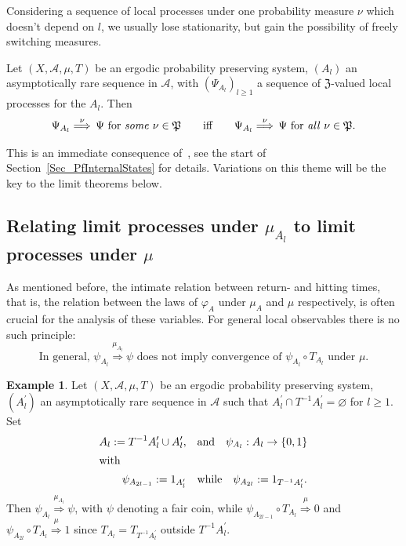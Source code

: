 \documentclass[10pt]{amsart}
\theoremstyle{definition}\newtheorem{defi}[theo]{Definition}\newtheorem{rema}[theo]{Remark}\newtheorem{exam}[theo]{Example}\newtheorem{exem}[theo]{Example}\newtheorem{nota}[theo]{Notation}
\newcommand{\clA}{\mathcal{A}}
\newcommand{\frkP}{\mathfrak{P}}
\newcommand{\frkZ}{\mathfrak{Z}}
\begin{document}
Considering a sequence of local processes under one probability measure $\nu$ which doesn't depend on $l$, we usually lose stationarity, but gain the possibility of freely switching measures.

\begin{prop}\label{P_SDCInternal}
Let $(X,\clA,\mu,T)$ be an ergodic probability preserving system, $(A_{l})$ an asymptotically rare sequence in $\clA$, with $(\Psi_{A_{l}})_{l\geq1}$ a sequence of $\frkZ$-valued local processes for the $A_{l}$. Then
\begin{equation}
\Psi_{A_{l}}\overset{\nu}{\Longrightarrow}\,\Psi\text{ for \emph{some} }\nu
\in\frkP\qquad \text{iff}\qquad\Psi_{A_{l}}\overset{\nu} {\Longrightarrow}\,\Psi\text{ for \emph{all} }\nu\in\frkP.
\end{equation}
\end{prop}

This is an immediate consequence of~\cite{Z7}, see the start of Section~\ref{Sec_PfInternalStates} for details. Variations on this theme will be the key to the limit theorems below.


\subsection{Relating limit processes under $\mu_{A_{l}}$ to limit processes under $\mu$}
As mentioned before, the intimate relation between return- and hitting times, that is, the relation between the laws of $\varphi_{A}$ under $\mu_{A}$ and $\mu$ respectively, is often crucial for the analysis of these variables. For general local observables there is no such principle:
\begin{equation} \label{Eq_AWarningLocObs}
\text{In general, }\psi_{A_{l}}\overset{\mu_{A_{l}}}{\Longrightarrow}
\psi\text{ does not imply convergence of }\psi_{A_{l}}\circ T_{A_{l}}\text{ under }\mu.
\end{equation}


\begin{exam}
Let $(X,\clA,\mu,T)$ be an ergodic probability preserving system, $(A_{l}^{\prime})$ an asymptotically rare sequence in $\clA$ such that $A_{l}^{\prime}\cap T^{-1}A_{l}^{\prime}=\varnothing$ for $l\geq1$. Set 
\begin{align*}
A_{l}:= T^{-1}A_{l}^{\prime}\cup A_{l}^{\prime}, \quad &\text{and}\quad\psi_{A_{l}} :A_{l}\rightarrow\{0,1\}\\
\intertext{with}
\psi_{A_{2l-1}}:= 1_{A_{l}^{\prime}}\quad &\text{while}\quad\psi_{A_{2l}}:=1_{T^{-1}A_{l}^{\prime}}.
\end{align*}
Then $\psi_{A_{l}}\overset {\mu_{A_{l}}}{\Longrightarrow}\psi$, with $\psi$ denoting a fair coin, while $\psi_{A_{2l-1}}\circ T_{A_{l}}\overset{\mu}{\Longrightarrow}0$ and $\psi_{A_{2l}}\circ T_{A_{l}}\overset{\mu}{\Longrightarrow}1$ since $T_{A_{l} }=T_{T^{-1}A_{l}^{\prime}}$ outside $T^{-1}A_{l}^{\prime}$.
\end{exam}
\end{document}
